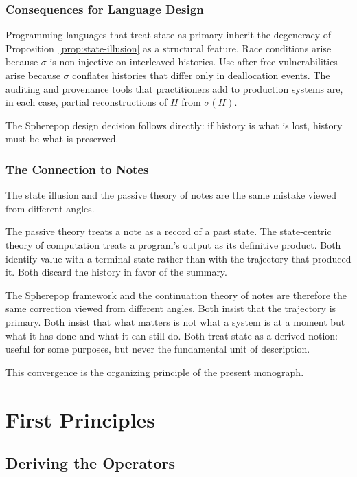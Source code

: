 \documentclass[12pt, a4paper, openany]{book}
\theoremstyle{plain}
\theoremstyle{definition}
\theoremstyle{remark}
\begin{document}
\section{Consequences for Language Design}

Programming languages that treat state as primary inherit the degeneracy of
Proposition~\ref{prop:state-illusion} as a structural feature. Race conditions
arise because $\sigma$ is non-injective on interleaved histories. Use-after-free
vulnerabilities arise because $\sigma$ conflates histories that differ only in
deallocation events. The auditing and provenance tools that practitioners add to
production systems are, in each case, partial reconstructions of $H$ from $\sigma(H)$.

The Spherepop design decision follows directly: if history is what is lost,
history must be what is preserved.

\section{The Connection to Notes}

The state illusion and the passive theory of notes are the same mistake viewed from
different angles.

The passive theory treats a note as a record of a past state. The state-centric
theory of computation treats a program's output as its definitive product. Both
identify value with a terminal state rather than with the trajectory that produced
it. Both discard the history in favor of the summary.

The Spherepop framework and the continuation theory of notes are therefore the
same correction viewed from different angles. Both insist that the trajectory is
primary. Both insist that what matters is not what a system is at a moment but
what it has done and what it can still do. Both treat state as a derived notion:
useful for some purposes, but never the fundamental unit of description.

This convergence is the organizing principle of the present monograph.

\part{First Principles}

\chapter{Deriving the Operators}
\end{document}
